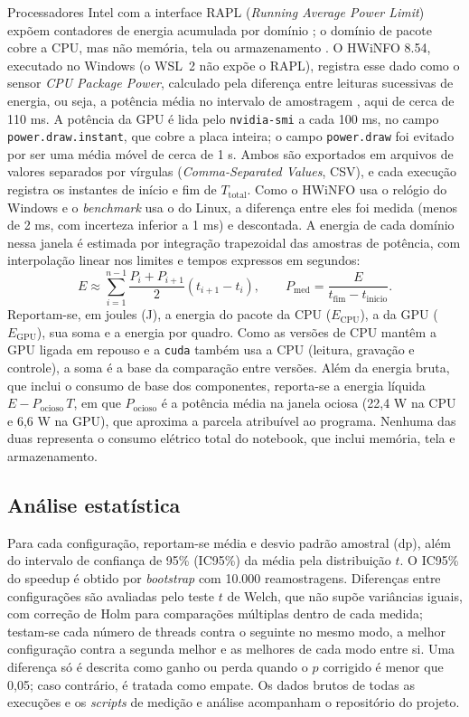 \documentclass[12pt]{article}
\begin{document}
Processadores Intel com a interface RAPL (\textit{Running Average Power Limit})
expõem contadores de energia acumulada por domínio \cite{intel_rapl}; o domínio
de pacote cobre a CPU, mas não memória, tela ou armazenamento \cite{intel_cdrd}.
O HWiNFO 8.54, executado no Windows (o WSL~2 não expõe o RAPL), registra esse
dado como o sensor \textit{CPU Package Power}, calculado pela diferença entre
leituras sucessivas de energia, ou seja, a potência média no intervalo de
amostragem \cite{hwinfo_forum}, aqui de cerca de 110 ms. A potência da GPU é
lida pelo \texttt{nvidia-smi} a cada 100 ms, no campo
\texttt{power.draw.instant}, que cobre a placa inteira; o campo
\texttt{power.draw} foi evitado por ser uma média móvel de cerca de 1 s. Ambos
são exportados em arquivos de valores separados por vírgulas
(\textit{Comma-Separated Values}, CSV), e cada execução registra os instantes
de início e fim de $T_{\mathrm{total}}$. Como o HWiNFO usa o relógio do Windows
e o \textit{benchmark} usa o do Linux, a diferença entre eles foi medida
(menos de 2 ms, com incerteza inferior a 1 ms) e descontada. A energia de cada
domínio nessa janela é estimada por integração trapezoidal das amostras de
potência, com interpolação linear nos limites e tempos expressos em segundos:
\[
E \approx
\sum_{i=1}^{n-1} \frac{P_i + P_{i+1}}{2}(t_{i+1} - t_i),
\qquad
P_{\mathrm{med}} = \frac{E}{t_{\mathrm{fim}} - t_{\mathrm{inicio}}}.
\]
Reportam-se, em joules (J), a energia do pacote da CPU ($E_{\mathrm{CPU}}$), a
da GPU ($E_{\mathrm{GPU}}$), sua soma e a energia por quadro. Como as versões de
CPU mantêm a GPU ligada em repouso e a \texttt{cuda} também usa a CPU (leitura,
gravação e controle), a soma é a base da comparação entre versões. Além da
energia bruta, que inclui o consumo de base dos componentes, reporta-se a
energia líquida $E - P_{\mathrm{ocioso}}\,T$, em que $P_{\mathrm{ocioso}}$ é a
potência média na janela ociosa (22,4 W na CPU e 6,6 W na GPU), que aproxima a
parcela atribuível ao programa. Nenhuma das duas representa o consumo elétrico
total do notebook, que inclui memória, tela e armazenamento.

\subsection{Análise estatística}

Para cada configuração, reportam-se média e desvio padrão amostral (dp), além
do intervalo de confiança de 95\% (IC95\%) da média pela distribuição $t$. O
IC95\% do speedup é obtido por \textit{bootstrap} com 10.000 reamostragens.
Diferenças entre configurações são avaliadas pelo teste $t$ de Welch, que não
supõe variâncias iguais, com correção de Holm para comparações múltiplas dentro
de cada medida; testam-se cada número de threads contra o seguinte no mesmo
modo, a melhor configuração contra a segunda melhor e as melhores de cada modo
entre si. Uma diferença só é descrita como ganho ou perda quando o $p$ corrigido
é menor que 0,05; caso contrário, é tratada como empate. Os dados brutos de
todas as execuções e os \textit{scripts} de medição e análise acompanham o
repositório do projeto.
\end{document}

